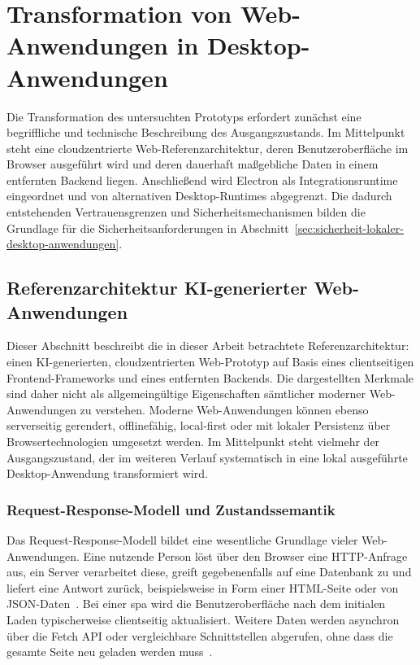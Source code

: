 \section{Transformation von Web-Anwendungen in Desktop-Anwendungen}
\label{sec:web-zu-desktop}
Die Transformation des untersuchten Prototyps erfordert zunächst eine begriffliche und technische Beschreibung des Ausgangszustands.
Im Mittelpunkt steht eine cloudzentrierte Web-Referenzarchitektur, deren Benutzeroberfläche im Browser ausgeführt wird und deren dauerhaft maßgebliche Daten in einem entfernten Backend liegen.
Anschließend wird Electron als Integrationsruntime eingeordnet und von alternativen Desktop-Runtimes abgegrenzt.
Die dadurch entstehenden Vertrauensgrenzen und Sicherheitsmechanismen bilden die Grundlage für die Sicherheitsanforderungen in Abschnitt~\ref{sec:sicherheit-lokaler-desktop-anwendungen}.
\subsection{Referenzarchitektur KI-generierter Web-Anwendungen}
\label{sec:referenzarchitektur-web}
Dieser Abschnitt beschreibt die in dieser Arbeit betrachtete Referenzarchitektur: einen KI-generierten, cloudzentrierten Web-Prototyp auf Basis eines clientseitigen Frontend-Frameworks und eines entfernten Backends.
Die dargestellten Merkmale sind daher nicht als allgemeingültige Eigenschaften sämtlicher moderner Web-Anwendungen zu verstehen.
Moderne Web-Anwendungen können ebenso serverseitig gerendert, offlinefähig, local-first oder mit lokaler Persistenz über Browsertechnologien umgesetzt werden.
Im Mittelpunkt steht vielmehr der Ausgangszustand, der im weiteren Verlauf systematisch in eine lokal ausgeführte Desktop-Anwendung transformiert wird.

\subsubsection{Request-Response-Modell und Zustandssemantik}
Das Request-Response-Modell bildet eine wesentliche Grundlage vieler Web-Anwendungen.
Eine nutzende Person löst über den Browser eine HTTP-Anfrage aus, ein Server verarbeitet diese, greift gegebenenfalls auf eine Datenbank zu und liefert eine Antwort zurück, beispielsweise in Form einer HTML-Seite oder von JSON-Daten~\cite{MDN2026ClientServer}.
Bei einer \gls{spa} wird die Benutzeroberfläche nach dem initialen Laden typischerweise clientseitig aktualisiert.
Weitere Daten werden asynchron über die Fetch API oder vergleichbare Schnittstellen abgerufen, ohne dass die gesamte Seite neu geladen werden muss~\cite{MDN2026JSFramework}.

